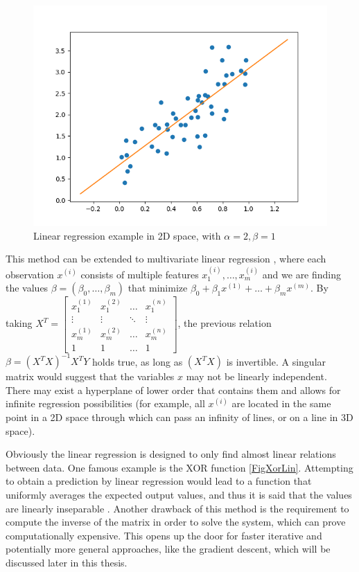 \begin{figure}[htbp]
	\centering
		\includegraphics[scale=0.5]{figures/lin_reg_2d.png}
	\caption{Linear regression example in 2D space, with $\alpha=2, \beta=1$}
	\label{FigLinReg2D}
\end{figure}

This method can be extended to multivariate linear regression \cite{linregreview}, where each observation $x^{(i)}$ consists of multiple features $x^{(i)}_1,\ldots,x^{(i)}_m$ and we are finding the values $\beta=(\beta_0,\ldots,\beta_m)$ that minimize $\beta_0 + \beta_1 x^{(1)}+\ldots+\beta_m x^{(m)}$. By taking $X^T=\begin{bmatrix}
x^{(1)}_1 & x^{(2)}_1 & \ldots & x^{(n)}_1 \\
\vdots & \vdots & \ddots & \vdots \\
x^{(1)}_m & x^{(2)}_m & \ldots & x^{(n)}_m \\
1 & 1 & \ldots & 1 
\end{bmatrix}$, the previous relation $\beta = (X^T X)^{-1}X^T Y$ holds true, as long as $ (X^T X)$ is invertible. A singular matrix would suggest that the variables $x$ may not be linearly independent. There may exist a hyperplane of lower order that contains them and allows for infinite regression possibilities (for example, all $x^{(i)}$ are located in the same point in a 2D space through which can pass an infinity of lines, or on a line in 3D space).

Obviously the linear regression is designed to only find almost linear relations between data. One famous example is the XOR function \ref{FigXorLin}. Attempting to obtain a prediction by linear regression would lead to a function that uniformly averages the expected output values, and thus it is said that the values are linearly inseparable \cite{xorexample}. Another drawback of this method is the requirement to compute the inverse of the matrix in order to solve the system, which can prove computationally expensive. This opens up the door for faster iterative and potentially more general approaches, like the gradient descent, which will be discussed later in this thesis.

